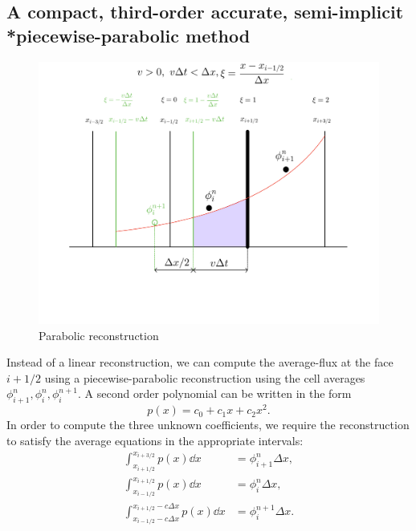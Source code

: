 \documentclass[../thesis.tex]{subfiles}
\begin{document}
\subsection[]{A compact, third-order accurate, semi-implicit \\*piecewise-parabolic method}
\begin{figure}[H]
	\centering
	\includegraphics[width=\textwidth]{implicit-ppm-crop.pdf}
	\caption{Parabolic reconstruction}
	\label{fig:implicit-ppm}
\end{figure}
Instead of a linear reconstruction,
we can compute the average-flux at the face \(i+1/2\) using a piecewise-parabolic reconstruction using the cell averages \(\phi_{i+1}^{n}, \phi_{i}^{n}, \phi_{i}^{n+1}\). A second order polynomial can be written in the form
\begin{equation}
    p(x) = c_0 + c_1 x + c_2 x^2.
\end{equation}
In order to compute the three unknown coefficients, we require the reconstruction to satisfy the average equations in the appropriate intervals:
\begin{equation}
    \begin{split}
        \int_{x_{i+1/2}}^{x_{i+3/2}} p(x) \dd{x}
        &= \phi_{i+1}^{n}\Delta x,
        \\
        \int_{x_{i-1/2}}^{x_{i+1/2}} p(x) \dd{x}
        &= \phi_{i}^{n}\Delta x,
        \\
        \int_{x_{i-1/2} - c\Delta x}^{x_{i+1/2} - c\Delta x} p(x) \dd{x}
        &= \phi_{i}^{n+1}\Delta x.
    \end{split}
\end{equation}
\end{document}
